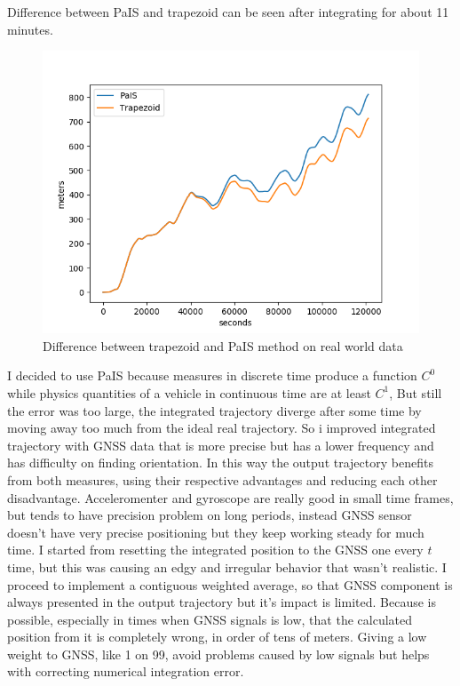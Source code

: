 Difference between PaIS and trapezoid can be seen after integrating for about 11 minutes.
\begin{figure}[H]
\includegraphics[scale=0.6]{trapezoid_vs_Pais_real_world.png}
\caption{Difference between trapezoid and PaIS method on real world data}
\end{figure}

\justify
I decided to use PaIS because measures in discrete time produce a function $C^0$ while physics quantities of a vehicle in continuous time are at least $C^1$, 
\justify
But still the error was too large, the integrated trajectory diverge after some time by moving away too much from the ideal real trajectory.
So i improved integrated trajectory with GNSS data that is more precise but has a lower frequency and has difficulty on finding orientation. In this way the output trajectory benefits from both measures, using their respective advantages and reducing each other disadvantage. Acceleromenter and gyroscope are really good in small time frames, but tends to have precision problem on long periods, instead GNSS sensor doesn't have very precise positioning but they keep working steady for much time.
I started from resetting the integrated position to the GNSS one every $t$ time, but this was causing an edgy and irregular behavior that wasn't realistic.
I proceed to implement a contiguous weighted average, so that GNSS component is always presented in the output trajectory but it's impact is limited. Because is possible, especially in times when GNSS signals is low, that the calculated position from it is completely wrong, in order of tens of meters. Giving a low weight to GNSS, like 1 on 99, avoid problems caused by low signals but helps with correcting numerical integration error.

